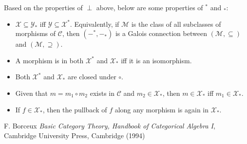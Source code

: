 \documentclass[12pt]{article}
\begin{document}
Based on the properties of $\perp$ above, below are some properties of $^*$ and $_*$:

\begin{itemize}
\item $\mathcal{X} \subseteq \mathcal{Y}_*$ iff $\mathcal{Y}\subseteq \mathcal{X}^*$.  Equivalently, if $\mathscr{M}$ is the class of all subclasses of morphisms of $\mathcal{C}$, then $(-^*,-_*)$ is a Galois connection between $(\mathscr{M},\subseteq)$ and $(\mathscr{M},\supseteq)$.
\item A morphism is in both $\mathcal{X}^*$ and $\mathcal{X}_*$ iff it is an isomorphism.
\item Both $\mathcal{X}^*$ and $\mathcal{X}_*$ are closed under $\circ$.
\item Given that $m=m_1\circ m_2$ exists in $\mathcal{C}$ and $m_2\in \mathcal{X}_*$, then $m \in \mathcal{X}_*$ iff $m_1\in \mathcal{X}_*$.
\item
If $f\in \mathcal{X}_*$, then the pullback of $f$ along any morphism is again in $\mathcal{X}_*$.
\end{itemize} 

\begin{thebibliography}{9}
 F. Borceux \emph{Basic Category Theory, Handbook of Categorical Algebra I}, Cambridge University Press, Cambridge (1994)
\end{thebibliography}
\end{document}
